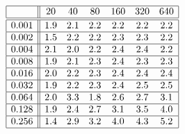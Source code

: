 \[
\begin{array}{|c||cccccc|}
\hline 
& 20 & 40 & 80 & 160 & 320 & 640\\
\hline \hline 
0.001 & 1.9 & 2.1 & 2.2 & 2.2 & 2.2 & 2.2 \\ \hline 
0.002 & 1.5 & 2.2 & 2.2 & 2.3 & 2.3 & 2.2 \\ \hline 
0.004 & 2.1 & 2.0 & 2.2 & 2.4 & 2.4 & 2.2 \\ \hline 
0.008 & 1.9 & 2.1 & 2.3 & 2.4 & 2.3 & 2.3 \\ \hline 
0.016 & 2.0 & 2.2 & 2.3 & 2.4 & 2.4 & 2.4 \\ \hline 
0.032 & 1.9 & 2.2 & 2.3 & 2.4 & 2.5 & 2.5 \\ \hline 
0.064 & 2.0 & 3.3 & 1.8 & 2.6 & 2.7 & 3.1 \\ \hline 
0.128 & 1.9 & 2.4 & 2.7 & 3.1 & 3.5 & 4.0 \\ \hline 
0.256 & 1.4 & 2.9 & 3.2 & 4.0 & 4.3 & 5.2 \\ \hline 
\end{array}
\]

